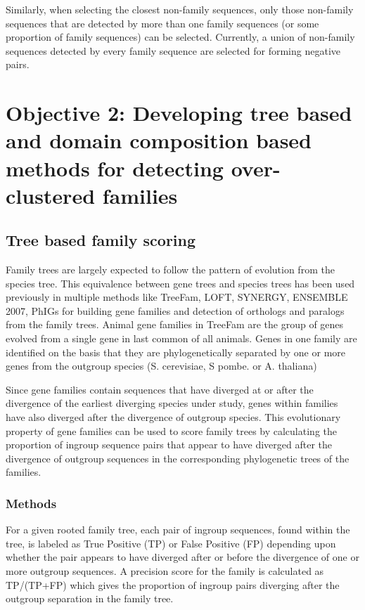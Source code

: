 \documentclass{article}
\begin{document}
			Similarly, when selecting the closest non-family sequences, only those non-family sequences that are detected by more than one family sequences (or some proportion of family sequences) can be selected. Currently, a union of non-family sequences detected by every family sequence are selected for forming negative pairs.
			
			\pagebreak
	
	\section{Objective 2: Developing tree based and domain composition based methods for detecting over-clustered families}	
	\subsection{Tree based family scoring}
	Family trees are largely expected to follow the pattern of evolution from the species tree. This equivalence between gene trees and species trees has been used previously in multiple methods like TreeFam, LOFT, SYNERGY, ENSEMBLE 2007, PhIGs \citep{li2006treefam,van2007orthology,wapinski2007automatic,hubbard2006ensembl,dehal2006phylogenomic} for building gene families and detection of orthologs and paralogs from the family trees. Animal gene families in TreeFam are the group of genes evolved from a single gene in last common of all animals. Genes in one family are identified on the basis that they are phylogenetically separated by one or more genes from the outgroup species (S. cerevisiae, S pombe. or A. thaliana)
	
	Since gene families contain sequences that have diverged at or after the divergence of the earliest diverging species under study, genes within families have also diverged after the divergence of outgroup species. This evolutionary property of gene families can be used to score family trees by calculating the proportion of ingroup sequence pairs that appear to have diverged after the divergence of outgroup sequences in the corresponding phylogenetic trees of the families.
		\subsubsection{Methods}
		For a given rooted family tree, each pair of ingroup sequences, found within the tree, is labeled as True Positive (TP) or False Positive (FP) depending upon whether the pair appears to have diverged after or before the divergence of one or more outgroup sequences. A precision score for the family is calculated  as TP/(TP+FP) which gives the proportion of ingroup pairs diverging after the outgroup separation in the family tree.
		
\end{document}
